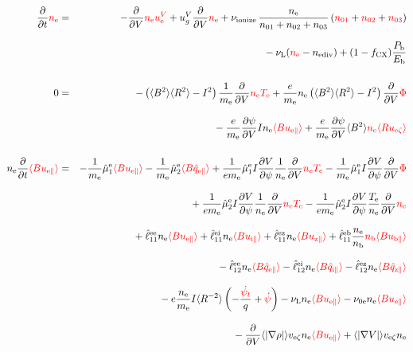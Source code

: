 \documentclass[11pt]{article}
\def\r#1{{\rm#1}}
\def\aves#1{\langle#1\rangle}
\def\dd#1#2{\frac{\partial #1}{\partial #2}}
\def\para{\parallel}
\def\ddV{\frac{\partial}{\partial V}}
\def\ddt{\frac{\partial}{\partial t}}
\def\psid{\dot{\psi}}
\def\psit{\psi_t}
\def\psitd{\dot{\psit}}
\def\me{m_\r{e}}
\def\nee{n_\r{e}}
\def\nb{n_\r{b}}
\def\Te{T_\r{e}}
\def\uzt#1{u_{\r{#1}\zeta}}
\def\upara#1{u_{\r{#1}\para}}
\def\qhatpara#1{\hat{q}_{\r{#1}\para}}
\def\uV#1{u_\r{#1}^V}
\def\ugV{u_{g}^V}
\def\nun#1{\nu_\r{0#1}}
\def\ndiv#1{n_\r{#1div}}
\def\bri{\aves{B^2}\aves{R^2} - I^2}
\def\Pb{P_\r{b}}
\def\Eb{E_\r{b}}
\def\nna{n_{01}}
\def\nnb{n_{02}}
\def\nnc{n_{03}}
\def\fCX{f_\r{CX}}
\def\nuL{\nu_\r{L}}
\def\nuion{\nu_\r{ionize}}
\def\red#1{\textcolor{red}{#1}}
\begin{document}
%
\begin{eqnarray}
  \ddt \red{\nee}  &=&
%
  - \ddV \red{\nee\uV{e}}
%
  + \ugV \ddV \red{\nee}
%
  + \nuion\, \frac{\nee}{\nna + \nnb + \nnc}\, (\red{\nna} + \red{\nnb}
  + \red{\nnc})
\nonumber\\[3mm]&&{}
%
  - \nuL (\red{\nee} - \ndiv{e})
%
  + (1 - \fCX) \frac{\Pb}{\Eb}
\\[5mm]
  0 &=&
%
  -        \left( \bri \right) \frac{1}{\me} \ddV \red{\nee \Te}
%
  + \frac{e}{\me} \nee \left( \bri \right) \ddV \red{\Phi}
\nonumber\\[3mm]&&{}
%
  - \frac{e}{\me} \dd{\psi}{V} I \nee \red{\aves{B\upara{e}}}
%
  + \frac{e}{\me} \dd{\psi}{V} \aves{B^2} \red{\nee \aves{R\uzt{e}}}
\\[5mm]
  \nee \ddt \red{\aves{B \upara{e}}} &=&
%
  - \frac{1}{\me} \hat{\mu}_1^\r{e} \red{\aves{B \upara{e}}}
  - \frac{1}{\me} \hat{\mu}_2^\r{e} \red{\aves{B \qhatpara{e}}}
%
  + \frac{1}{e\me} \hat{\mu}_1^\r{e} I \dd{V}{\psi} \frac{1}{\nee} \ddV
  \red{\nee \Te}
  - \frac{1}{\me} \hat{\mu}_1^\r{e} I \dd{V}{\psi} \ddV \red{\Phi}
\nonumber\\[3mm]&&{}
%
  + \frac{1}{e\me} \hat{\mu}_2^\r{e} I \dd{V}{\psi} \frac{1}{\nee} \ddV
  \red{\nee \Te}
  - \frac{1}{e\me} \hat{\mu}_2^\r{e} I \dd{V}{\psi} \frac{\Te}{\nee} \ddV
  \red{\nee}
\nonumber\\[3mm]&&{}
%
  + \hat{\ell}_{11}^{\r{ee}} \nee \red{\aves{B \upara{e}}}
  + \hat{\ell}_{11}^{\r{ei}} \nee \red{\aves{B \upara{i}}}
  + \hat{\ell}_{11}^{\r{ez}} \nee \red{\aves{B \upara{z}}}
  + \hat{\ell}_{11}^{\r{eb}} \frac{\nee}{\nb} \red{\nb \aves{B \upara{b}}}
\nonumber\\[3mm]&&{}
%
  - \hat{\ell}_{12}^{\r{ee}} \nee \red{\aves{B \qhatpara{e}}}
  - \hat{\ell}_{12}^{\r{ei}} \nee \red{\aves{B \qhatpara{i}}}
  - \hat{\ell}_{12}^{\r{ez}} \nee \red{\aves{B \qhatpara{z}}}
\nonumber\\[3mm]&&{}
%
  - e \frac{\nee}{\me} I \aves{R^{-2}} \left( - \frac{\red{\psitd}}{q} + \red{\psid} \right)
%
%
  - \nuL \nee \red{\aves{B \upara{e}}}
%
  - \nun{e} \nee \red{\aves{B \upara{e}}}
\nonumber\\[3mm]&&{}
%
  - \ddV \aves{|\nabla \rho|} v_{\r{e}\zeta} \nee \red{\aves{B \upara{e}}}
%
  + \aves{|\nabla V|} v_{\r{e}\zeta} \nee 

\end{eqnarray}
\end{document}
